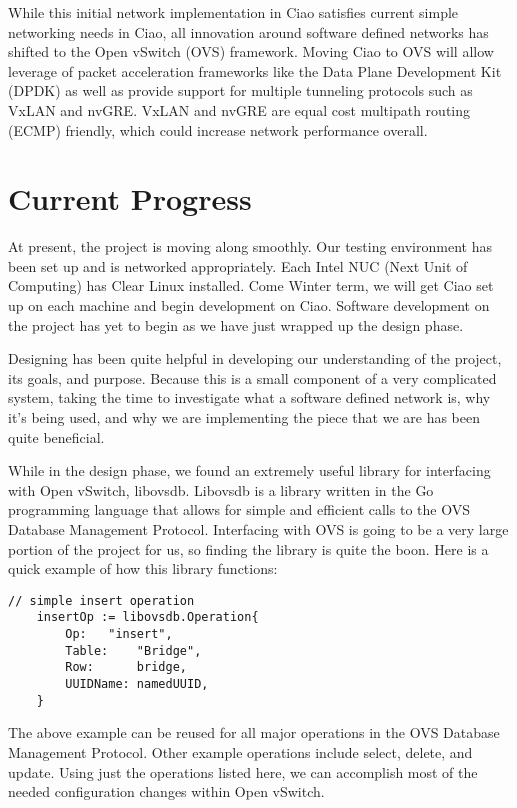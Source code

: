 \documentclass[10pt,onecolumn,journal,draftclsnofoot]{IEEEtran}
\begin{document}
While this initial network implementation in Ciao satisfies current simple
networking needs in Ciao, all innovation around software defined networks has
shifted to the Open vSwitch (OVS) framework. Moving Ciao to OVS will allow
leverage of packet acceleration frameworks like the Data Plane Development Kit
(DPDK) as well as provide support for multiple tunneling protocols such as VxLAN
and nvGRE. VxLAN and nvGRE are equal cost multipath routing (ECMP) friendly,
which could increase network performance overall.

\section{Current Progress}
At present, the project is moving along smoothly. Our testing environment has
been set up and is networked appropriately. Each Intel NUC (Next Unit of
Computing) has Clear Linux installed. Come Winter term, we will get Ciao set up
on each machine and begin development on Ciao. Software development on the
project has yet to begin as we have just wrapped up the design phase.

Designing has been quite helpful in developing our understanding of the project,
its goals, and purpose. Because this is a small component of a very complicated
system, taking the time to investigate what a software defined network is, why
it's being used, and why we are implementing the piece that we are has been
quite beneficial.

While in the design phase, we found an extremely useful library for interfacing
with Open vSwitch, libovsdb. Libovsdb is a library written in the Go programming
language that allows for simple and efficient calls to the OVS Database
Management Protocol. Interfacing with OVS is going to be a very large
portion of the project for us, so finding the library is quite the boon. Here
is a quick example of how this library functions:\cite{gosample}\\

\begin{lstlisting}[caption=Example insert operation using libovsdb]
	// simple insert operation
	insertOp := libovsdb.Operation{
		Op:	  "insert",
		Table:	  "Bridge",
		Row:	  bridge,
		UUIDName: namedUUID,
	}
\end{lstlisting}

The above example can be reused for all major operations in the OVS Database
Management Protocol. Other example operations include select, delete, and
update. Using just the operations listed here, we can accomplish most of the
needed configuration changes within Open vSwitch.
\end{document}
